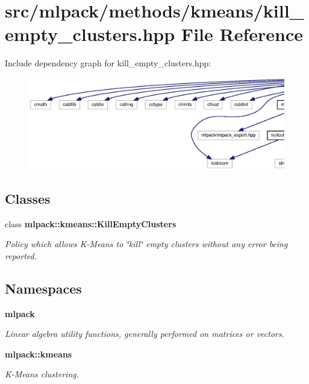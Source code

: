 \section{src/mlpack/methods/kmeans/kill\+\_\+empty\+\_\+clusters.hpp File Reference}
\label{kill__empty__clusters_8hpp}
Include dependency graph for kill\+\_\+empty\+\_\+clusters.\+hpp\+:
\nopagebreak
\begin{figure}[H]
\begin{center}
\leavevmode
\includegraphics[width=350pt]{kill__empty__clusters_8hpp__incl}
\end{center}
\end{figure}
\subsection*{Classes}
\begin{DoxyCompactItemize}
\item 
class {\bf mlpack\+::kmeans\+::\+Kill\+Empty\+Clusters}
\begin{DoxyCompactList}\small\item\em Policy which allows K-\/\+Means to \char`\"{}kill\char`\"{} empty clusters without any error being reported. \end{DoxyCompactList}\end{DoxyCompactItemize}
\subsection*{Namespaces}
\begin{DoxyCompactItemize}
\item 
 {\bf mlpack}
\begin{DoxyCompactList}\small\item\em Linear algebra utility functions, generally performed on matrices or vectors. \end{DoxyCompactList}\item 
 {\bf mlpack\+::kmeans}
\begin{DoxyCompactList}\small\item\em K-\/\+Means clustering. \end{DoxyCompactList}\end{DoxyCompactItemize}
